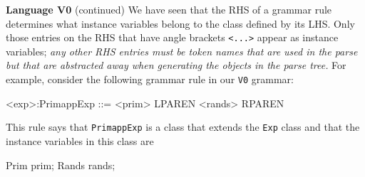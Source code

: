 \begin{minipage}[t]{\sw}
\slidenumber
\LARGE
{\bf Language V0} (continued)\exx
We have seen that
the RHS of a grammar rule determines
what instance variables belong to the class defined by its LHS.
Only those entries on the RHS that have angle brackets \verb'<...>'
appear as instance variables;
{\em any other RHS entries must be token names
that are used in the parse but that are abstracted away
when generating the objects in the parse tree.}\exx
For example, consider the following grammar rule in our \verb'V0' grammar:
\begin{qv}
<exp>:PrimappExp ::= <prim> LPAREN <rands> RPAREN
\end{qv}
This rule says that \verb'PrimappExp' is a class
that extends the \verb'Exp' class
and that the instance variables in this class are
\begin{qv}
Prim prim;
Rands rands;
\end{qv}
\end{minipage}
